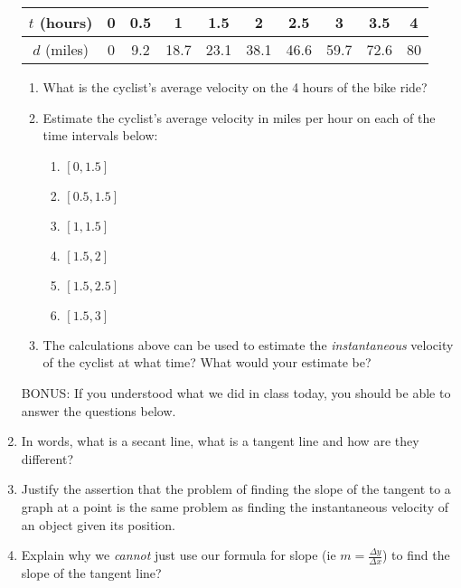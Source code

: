 \documentclass[11pt,fleqn]{article}
\begin{document}
\begin{enumerate}
\begin{tabular}{|c||c|c|c|c|c|c|c|c|c|}
$t$ (hours) &0&0.5&1&1.5&2&2.5&3&3.5&4\\
\hline
$d$ (miles) &0&9.2&18.7&23.1&38.1&46.6&59.7&72.6&80\\
\end{tabular}
\begin{enumerate}
\item What is the cyclist's average velocity on the 4 hours of the bike ride?
\vfill
\item Estimate the cyclist's average velocity in miles per hour on each of the time intervals below:
\begin{enumerate}
\item $[0,1.5]$\\ \vfill
\item $[0.5,1.5]$\\ \vfill
\item $[1,1.5]$\\ \vfill
\item $[1.5,2]$\\ \vfill
\item $[1.5,2.5]$\\ \vfill
\item $[1.5,3]$\\ \vfill
\end{enumerate}

\item The calculations above can be used to estimate the \emph{instantaneous} velocity of the cyclist at what time? What would your estimate be?\\  \vfill
\end{enumerate}
\newpage
BONUS: If you understood what we did in class today, you should be able to answer the questions below.
\item In words, what is a secant line, what is a tangent line and how are they different?
\vfill
\item Justify the assertion that the problem of finding the slope of the tangent to a graph at a point is the same problem as finding the instantaneous velocity of an object given its position.
\vfill
\item Explain why we \emph{cannot} just use our formula for slope (ie $m=\frac{\Delta y}{\Delta x}$) to find the slope of the tangent line?
\vfill
\end{enumerate}
\end{document}
